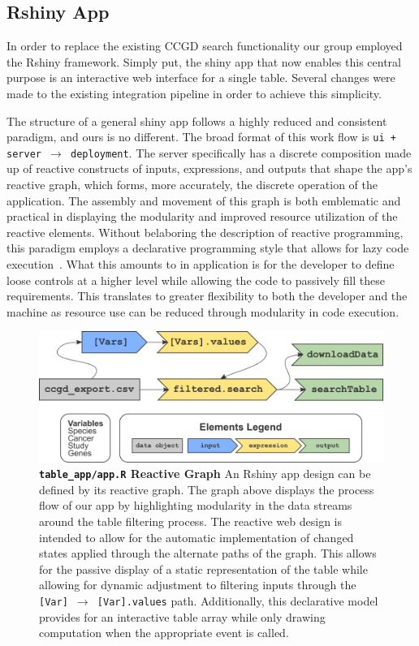 \documentclass[10pt]{report}
\begin{document}
\subsection{Rshiny App}
In order to replace the existing CCGD search functionality our group employed the Rshiny framework. Simply put, the shiny app that now enables this central purpose is an interactive web interface for a single table. Several changes were made to the existing integration pipeline in order to achieve this simplicity.

The structure of a general shiny app follows a highly reduced and consistent paradigm, and ours is no different. The broad format of this work flow is \texttt{ui + server $\rightarrow$ deployment}. The server specifically has a discrete composition made up of reactive constructs of inputs, expressions, and outputs that shape the app's reactive graph, which forms, more accurately, the discrete operation of the application. The assembly and movement of this graph is both emblematic and practical in displaying the modularity and improved resource utilization of the reactive elements. Without belaboring the description of reactive programming, this paradigm employs a declarative programming style that allows for lazy code execution~\cite{Wickham}. What this amounts to in application is for the developer to define loose controls at a higher level while allowing the code to passively fill these requirements. This translates to greater flexibility to both the developer and the machine as resource use can be reduced through modularity in code execution.

\begin{figure}[H]
    \centering
    \includegraphics[width=\textwidth]{fig/reactive_graph.png}
    \caption[\texttt{table\_app/app.R} Reactive Graph]{\textbf{\texttt{table\_app/app.R} Reactive Graph} An Rshiny app design can be defined by its reactive graph. The graph above displays the process flow of our app by highlighting modularity in the data streams around the table filtering process. The reactive web design is intended to allow for the automatic implementation of changed states applied through the alternate paths of the graph. This allows for the passive display of a static representation of the table while allowing for dynamic adjustment to filtering inputs through the \texttt{[Var] $\rightarrow$ [Var].values} path. Additionally, this declarative model provides for an interactive table array while only drawing computation when the appropriate event is called.}\label{fig:reactiveGraph}
\end{figure}
\end{document}
